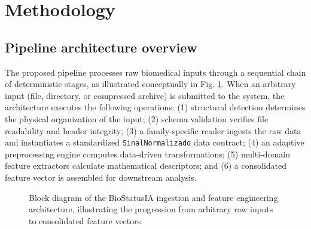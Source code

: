 \section{Methodology}
\label{sec:metodologia}

\subsection{Pipeline architecture overview}
The proposed pipeline processes raw biomedical inputs through a sequential chain of deterministic stages, as illustrated conceptually in Fig. \ref{fig:pipeline_flow}. When an arbitrary input (file, directory, or compressed archive) is submitted to the system, the architecture executes the following operations:
(1) structural detection determines the physical organization of the input;
(2) schema validation verifies file readability and header integrity;
(3) a family-specific reader ingests the raw data and instantiates a standardized \texttt{SinalNormalizado} data contract;
(4) an adaptive preprocessing engine computes data-driven transformations;
(5) multi-domain feature extractors calculate mathematical descriptors; and
(6) a consolidated feature vector is assembled for downstream analysis.

\begin{figure}[htbp]
\centering
{}
\caption{Block diagram of the BioStatusIA ingestion and feature engineering architecture, illustrating the progression from arbitrary raw inputs to consolidated feature vectors.}
\label{fig:pipeline_flow}
\end{figure}

